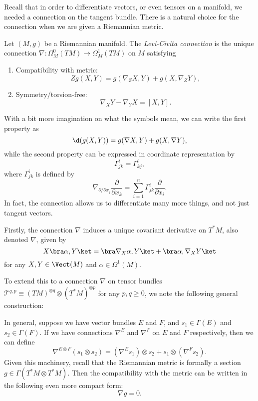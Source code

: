 \documentclass[a4paper]{article}
\begin{document}
Recall that in order to differentiate vectors, or even tensors on a manifold, we needed a connection on the tangent bundle. There is a natural choice for the connection when we are given a Riemannian metric.
\begin{defi}
  Let $(M, g)$ be a Riemannian manifold. The \emph{Levi-Civita connection} is the unique connection $\nabla: \Omega^0_M(TM) \to \Omega^1_M(TM)$ on $M$ satisfying
  \begin{enumerate}
    \item Compatibility with metric:
      \[
        Z g(X, Y) = g(\nabla_Z X, Y) + g(X, \nabla_Z Y),
      \]
    \item Symmetry/torsion-free:
      \[
        \nabla_X Y - \nabla_Y X = [X, Y].
      \]
  \end{enumerate}
\end{defi}
With a bit more imagination on what the symbols mean, we can write the first property as
\[
  \d (g(X, Y)) = g(\nabla X, Y) + g(X, \nabla Y),
\]
while the second property can be expressed in coordinate representation by
\[
  \Gamma_{jk}^i = \Gamma_{kj}^i,
\]
where $\Gamma_{jk}^i$ is defined by
\[
  \nabla_{\partial/\partial x_j} \frac{\partial}{\partial x_k} = \sum_{i = 1}^n \Gamma_{jk}^i \frac{\partial}{\partial x_i}.
\]
In fact, the connection allows us to differentiate many more things, and not just tangent vectors.

Firstly, the connection $\nabla$ induces a unique covariant derivative on $T^*M$, also denoted $\nabla$, given by
\[
  X\bra \alpha, Y\ket = \bra \nabla_X \alpha , Y\ket + \bra \alpha, \nabla_X Y\ket
\]
for any $X,Y \in \Vect(M)$ and $\alpha \in \Omega^1(M)$.

To extend this to a connection $\nabla$ on tensor bundles $\mathcal{T}^{q, p} \equiv (TM)^{\otimes q} \otimes (T^*M)^{\otimes p}$ for any $p, q \geq 0$, we note the following general construction:

In general, suppose we have vector bundles $E$ and $F$, and $s_1 \in \Gamma(E)$ and $s_2 \in \Gamma(F)$. If we have connections $\nabla^E$ and $\nabla^F$ on $E$ and $F$ respectively, then we can define
\[
  \nabla^{E\otimes F} (s_1 \otimes s_2) = (\nabla^E s_1) \otimes s_2 + s_1 \otimes (\nabla^F s_2).
\]
Given this machinery, recall that the Riemannian metric is formally a section $g \in \Gamma(T^*M \otimes T^*M)$. Then the compatibility with the metric can be written in the following even more compact form:
\[
  \nabla g = 0.
\]
\end{document}
